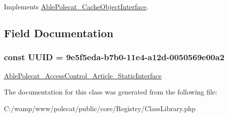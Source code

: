 Implements \hyperlink{interface_able_polecat___cache_object_interface_a3f2135f6ad45f51d075657f6d20db2cd}{Able\+Polecat\+\_\+\+Cache\+Object\+Interface}.



\subsection{Field Documentation}
\hypertarget{class_able_polecat___registry___class_library_a74b892c8c0b86bf9d04c5819898c51e7}{}
\subsubsection[{U\+U\+I\+D}]{\setlength{\rightskip}{0pt plus 5cm}const U\+U\+I\+D = \textquotesingle{}9e5f5eda-\/b7b0-\/11e4-\/a12d-\/0050569e00a2\textquotesingle{}}\label{class_able_polecat___registry___class_library_a74b892c8c0b86bf9d04c5819898c51e7}
\hyperlink{interface_able_polecat___access_control___article___static_interface}{Able\+Polecat\+\_\+\+Access\+Control\+\_\+\+Article\+\_\+\+Static\+Interface} 

The documentation for this class was generated from the following file\+:\begin{DoxyCompactItemize}
\item 
C\+:/wamp/www/polecat/public/core/\+Registry/Class\+Library.\+php\end{DoxyCompactItemize}
